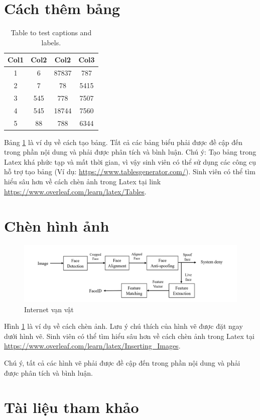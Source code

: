 \section*{Cách thêm bảng}
\begin{table}[h!]
\centering
\begin{tabular}{||c c c c||} 
 \hline
 Col1 & Col2 & Col2 & Col3 \\ [0.5ex] 
 \hline\hline
 1 & 6 & 87837 & 787 \\ 
 2 & 7 & 78 & 5415 \\
 3 & 545 & 778 & 7507 \\
 4 & 545 & 18744 & 7560 \\
 5 & 88 & 788 & 6344 \\ [1ex] 
 \hline
\end{tabular}
\caption{Table to test captions and labels.}
\label{table:1}
\end{table}
Bảng \ref{table:1} là ví dụ về cách tạo bảng. Tất cả các bảng biểu phải được đề cập đến trong phần nội dung và phải được phân tích và bình luận.  Chú ý: Tạo bảng trong Latex khá phức tạp và mất thời gian, vì vậy sinh viên có thể sử dụng các công cụ hỗ trợ tạo bảng (Ví dụ: \url{https://www.tablesgenerator.com/}).
Sinh viên có thể tìm hiểu sâu hơn về cách chèn ảnh trong Latex tại link \url{https://www.overleaf.com/learn/latex/Tables}.

\section*{Chèn hình ảnh}
\begin{figure}
\centering
\includegraphics[width=0.75\linewidth]{Figures/LuongMohinh.png}
\caption{Internet vạn vật}
\label{fig:iot}
\end{figure}

Hình \ref{fig:iot} là ví dụ về cách chèn ảnh. Lưu ý chú thích của hình vẽ được đặt ngay dưới hình vẽ. Sinh viên có thể tìm hiểu sâu hơn về cách chèn ảnh trong Latex tại \url{https://www.overleaf.com/learn/latex/Inserting_Images}.

Chú ý, tất cả các hình vẽ phải được đề cập đến trong phần nội dung và phải được phân tích và bình luận. 

\section*{Tài liệu tham khảo}
